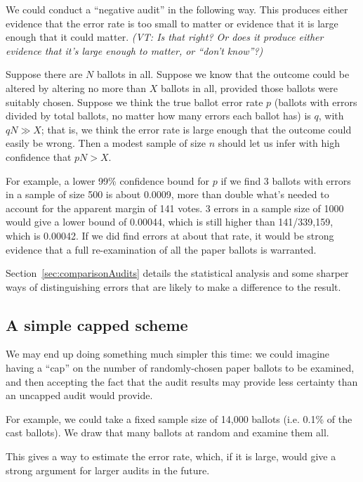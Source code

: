 \documentclass[10pt,a4paper]{article}
\newcommand{\VTNote}[1]{{\it(VT: #1)}}
\begin{document}
We could conduct a ``negative audit'' in the following way.  
This produces either evidence that the error rate is too small to matter or evidence that it is large enough that it could matter.  \VTNote{Is that right?  Or does it produce either evidence that it's large enough to matter, or ``don't know''?}

Suppose there are $N$ ballots in all.
Suppose we know that the outcome could be altered by altering no more than $X$ ballots in all, provided those ballots were suitably chosen.  Suppose
we think the true ballot error rate $p$ (ballots with errors divided by total ballots, no matter how many errors each ballot has) is $q$, with $qN \gg X$; that is, we think the error rate is large enough that the outcome could easily be wrong.  Then a modest sample
of size $n$ should let us infer with high confidence that $pN > X$. 

For example, a lower 99\% confidence bound for $p$ if we find 3 ballots with errors in a sample of size 500 is about 0.0009, more than double
what's needed to account for the apparent margin of 141 votes. 3 errors in a sample size of 1000 would give a lower bound of 0.00044, which is still higher than
141/339,159, which is 0.00042.  If we did find errors at about that rate, it would be strong evidence that a full re-examination of all the paper ballots is warranted.

Section~\ref{sec:comparisonAudits} details the statistical analysis and some sharper ways of distinguishing errors that are likely to make a difference to the result.

\subsection{A simple capped scheme}
We may end up doing something much simpler this time: we
could imagine having a ``cap'' on the number of randomly-chosen 
paper ballots to be examined, and then accepting the fact that
the audit results may provide less certainty than an uncapped
audit would provide.

For example, we could take a fixed sample size of 14,000
ballots (i.e. 0.1\% of the cast ballots).  We draw that
many ballots at random and examine them all.

This gives a way to estimate the error rate, which, if it is large, would give a strong argument for larger audits in the future.
\end{document}
